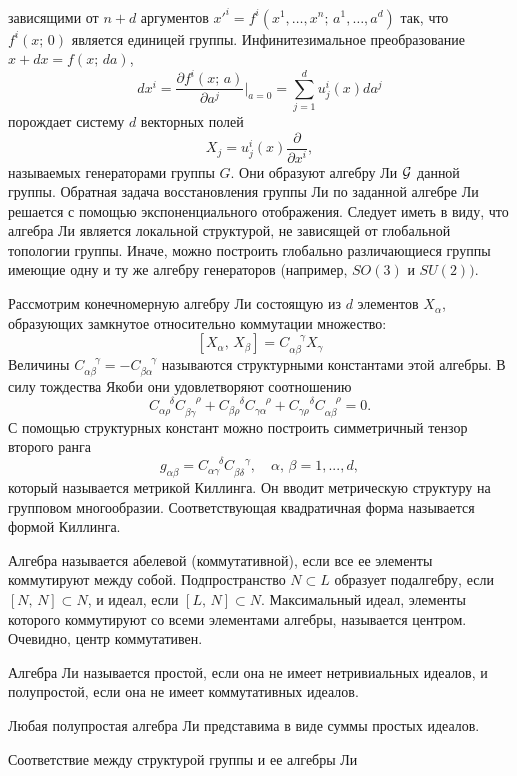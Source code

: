 \documentclass[a4paper
]{article}
\begin{document}
зависящими от $ n+d$  аргументов
$x'^i=f^i(x^1,\ldots,x^n;\,a^1,\ldots,a^d)$ так, что $f^i(x;\,0)$
является единицей группы. Инфинитезимальное преобразование
$x+dx=f(x;\, da)$, $$dx^i=\frac{\partial f^i(x;\,a)}{\partial
a^j}\Bigg|_{a=0}=\sum_{j=1}^d u^i_j(x)da^j$$ порождает систему $d$
векторных полей $$X_j=u^i_j(x)\frac{\partial}{\partial x^i },$$
называемых генераторами группы $G$. Они образуют алгебру Ли ${\cal
G}$ данной группы. Обратная задача восстановления группы Ли по
заданной алгебре Ли решается с помощью экспоненциального
отображения. Следует иметь в виду, что алгебра Ли является
локальной структурой, не зависящей от глобальной топологии группы.
Иначе, можно построить глобально различающиеся группы имеющие одну
и  ту же алгебру генераторов (например, $SO(3)$ и $SU(2))$. \par
Рассмотрим конечномерную алгебру Ли состоящую из $d$ элементов
$X_\alpha$, образующих замкнутое относительно коммутации
множество:
$$[X_\alpha,\,X_\beta]=C_{\alpha\beta}^{\;\;\;\;\gamma} X_\gamma$$
Величины $C_{\alpha\beta}^{\;\;\;\;\gamma}=-
C_{\beta\alpha}^{\;\;\;\;\gamma}$ называются структурными
константами этой алгебры. В силу тождества Якоби они удовлетворяют
соотношению
\begin{equation}\label{cjak}
C_{\alpha\rho}^{\;\;\;\;\delta}C_{ \beta\gamma}^{\;\;\;\;\rho}+
C_{\beta\rho}^{\;\;\;\;\delta }C_{\gamma\alpha }^{\;\;\;\;\rho}+
C_{\gamma\rho}^{\;\;\;\;\delta}C_{\alpha\beta}^{\;\;\;\;\rho}=0.
\end{equation}
С помощью структурных констант можно построить симметричный тензор
второго ранга
$$g_{\alpha\beta}=C_{ \alpha\gamma}^{\;\;\;\;\delta}C_{\beta\delta}^{\;\;\;\;\gamma},
\quad \alpha,\,\beta=1,...,d,$$ который называется метрикой
Киллинга. Он вводит метрическую структуру на групповом
многообразии. Соответствующая квадратичная форма называется формой
Киллинга.
\par
Алгебра называется абелевой (коммутативной), если все ее элементы
коммутируют между собой. Подпространство $N\subset L$ образует
подалгебру, если $[N,\, N]\subset N$, и идеал, если $[L,\,
N]\subset N$. Максимальный идеал, элементы которого коммутируют со
всеми элементами алгебры, называется центром. Очевидно, центр
коммутативен. \begin{Def}Алгебра Ли называется простой, если она
не имеет нетривиальных идеалов, и полупростой, если она не имеет
коммутативных идеалов.\end{Def}\noindent  Любая полупростая
алгебра Ли представима в виде суммы простых идеалов.
\par Соответствие между структурой группы и ее алгебры Ли
\end{document}
